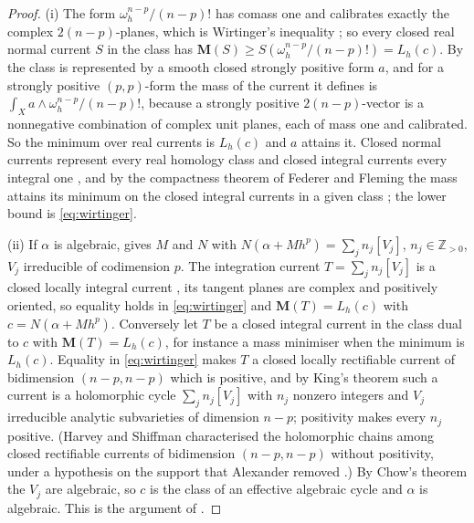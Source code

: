 \documentclass[11pt,reqno]{amsart}
\theoremstyle{plain}
\theoremstyle{definition}
\theoremstyle{remark}
\newcommand{\ZZ}{\mathbb{Z}}
\begin{document}
\begin{proof}
(i) The form $\omega_{h}^{n-p}/(n-p)!$ has comass one and calibrates exactly
the complex $2(n-p)$-planes, which is Wirtinger's inequality
\cite[1.8.2]{Fed69}; so every closed real normal current $S$ in the class has
$\mathbf{M}(S)\ge S(\omega_{h}^{n-p}/(n-p)!)=L_{h}(c)$. By
 the class is represented by a smooth closed
strongly positive form $a$, and for a strongly positive $(p,p)$-form the mass of
the current it defines is $\int_{X}a\wedge\omega_{h}^{n-p}/(n-p)!$, because a
strongly positive $2(n-p)$-vector is a nonnegative combination of complex unit
planes, each of mass one and calibrated. So the minimum over real currents is
$L_{h}(c)$ and $a$ attains it. Closed normal currents represent every real
homology class and closed integral currents every integral one
\cite[5.11]{FF60}, and by the compactness theorem of Federer and Fleming the
mass attains its minimum on the closed integral currents in a given class
\cite[9.6]{FF60}; the lower bound is \eqref{eq:wirtinger}.

(ii) If $\alpha$ is algebraic,  gives $M$ and $N$ with
$N(\alpha+Mh^{p})=\sum_{j}n_{j}[V_{j}]$, $n_{j}\in\ZZ_{>0}$, $V_{j}$
irreducible of codimension $p$. The integration current $T=\sum_{j}n_{j}[V_{j}]$
is a closed locally integral current \cite[Theorem~3.1.1]{Kin71}, its tangent
planes are complex and positively oriented, so equality holds in
\eqref{eq:wirtinger} and $\mathbf{M}(T)=L_{h}(c)$ with $c=N(\alpha+Mh^{p})$.
Conversely let $T$ be a closed integral current in the class dual to $c$ with
$\mathbf{M}(T)=L_{h}(c)$, for instance a mass minimiser when the minimum is
$L_{h}(c)$. Equality in \eqref{eq:wirtinger} makes $T$ a closed locally
rectifiable current of bidimension $(n-p,n-p)$ which is positive, and by
King's theorem \cite[Theorem~5.2.1]{Kin71} such a current is a holomorphic
cycle $\sum_{j}n_{j}[V_{j}]$ with $n_{j}$ nonzero integers and $V_{j}$
irreducible analytic subvarieties of dimension $n-p$; positivity makes every
$n_{j}$ positive. (Harvey and Shiffman characterised the holomorphic chains
among closed rectifiable currents of bidimension $(n-p,n-p)$ without
positivity, under a hypothesis on the support that Alexander removed
\cite{HS74,Ale97}.) By Chow's theorem \cite[p.~167]{GH78} the $V_{j}$
are algebraic, so $c$ is the class of an effective algebraic cycle and $\alpha$
is algebraic. This is the argument of \cite[Proposition~6.13]{HL09}.


\end{proof}
\end{document}
